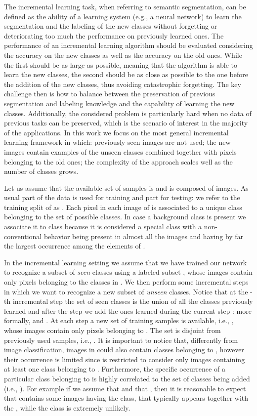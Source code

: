 \documentclass[10pt,twocolumn,letterpaper]{article}
\begin{document}
The incremental learning task, when referring to semantic segmentation, can be defined as the ability of a learning system (e.g., a neural network) to learn the segmentation and the labeling of the new classes without forgetting or deteriorating too much the performance on previously learned ones. The performance of an incremental learning algorithm should be evaluated considering the accuracy on the new classes as well as the accuracy on the old ones. While the first should be as large as possible, meaning that the algorithm is able to learn the new classes, the second should be as close as possible to the one before the addition of the new classes, thus avoiding catastrophic forgetting. The key challenge then is how to balance between the preservation of previous segmentation and labeling knowledge and the capability of  learning the new classes. 
Additionally, the considered problem is particularly hard when no data of previous tasks can be preserved, which is the scenario of interest in the majority of the applications. In this work we focus on the most general incremental learning framework in which: previously seen images are not used; the new images contain examples of the unseen classes combined together with pixels belonging to the old ones;  the complexity of the approach scales well as the number of classes grows.

Let us assume that the available set of samples is   and is composed of  images. As usual part of the data is used for training and part for testing: we refer to the training split of  as .
Each pixel in each image of  is associated to a unique class belonging to the set  of  possible classes.
In case a background class is present we associate it to class  because it is considered a special class with a non-conventional behavior being present in almost all the images and having by far the largest occurrence among the elements of .

In the incremental learning setting we assume that we have trained our network to recognize a subset  of \textit{seen} classes using a labeled subset , whose images contain only pixels belonging to the classes in . We then perform some incremental steps  in which we want to recognize a new subset  of \textit{unseen} classes. 
Notice that at the -th incremental step the set of seen classes   is the union of all the classes previously learned and after the step we  add the ones learned during the current step : more formally,  and  .
At each step  a new set of training samples is available, i.e., , whose images contain only pixels belonging to . The set is disjoint from previously used samples, i.e., . It is important to notice that, differently from image classification, images in  could also contain classes belonging to , however their occurrence is limited since  is restricted to consider only images containing at least one class belonging to .  Furthermore, the specific occurrence of a particular class belonging to  is highly correlated to the set of classes being added (i.e., ). For example if we assume that  and that , then it is reasonable to expect that  contains some images having the   class, that typically appears together with the , while the class  is extremely unlikely.
 
\end{document}
